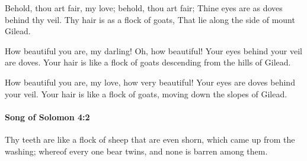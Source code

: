 			\begin{versebox}
					\item[BHS] 
					\item[LXX] 
					\item[ASV] Behold, thou art fair, my love; behold, thou art fair; Thine eyes are as doves behind thy veil. Thy hair is as a flock of goats, That lie along the side of mount Gilead.
					\item[NIV] How beautiful you are, my darling! Oh, how beautiful! Your eyes behind your veil are doves. Your hair is like a flock of goats descending from the hills of Gilead.
					\item[NRSV] How beautiful you are, my love, how very beautiful! Your eyes are doves behind your veil. Your hair is like a flock of goats, moving down the slopes of Gilead.
			\end{versebox}

		\paragraph{Song of Solomon 4:2} %
			\label{SONGOFSOLOMON-4-2}

			Thy teeth are like a flock of sheep that are even shorn, which came up from the washing; whereof every one bear twins, and none is barren among them.

